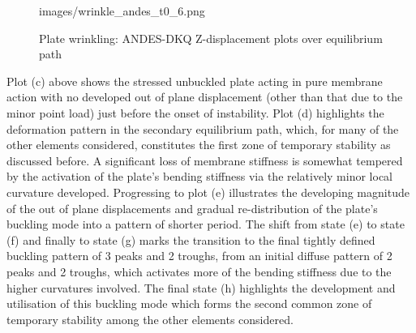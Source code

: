 \begin{figure}[H]
{	{images/wrinkle_andes_t0_6.png}}
	\\
	\caption{\label{wrinkle 3}Plate wrinkling: ANDES-DKQ Z-displacement plots over equilibrium path}
\end{figure}

Plot (c) above shows the stressed unbuckled plate acting in pure membrane action with no developed out of plane displacement (other than that due to the minor point load) just before the onset of instability. Plot (d) highlights the deformation pattern in the secondary equilibrium path, which, for many of the other elements considered, constitutes the first zone of temporary stability as discussed before. A significant loss of membrane stiffness is somewhat tempered by the activation of the plate's bending stiffness via the relatively minor local curvature developed. Progressing to plot (e) illustrates the developing magnitude of the out of plane displacements and gradual re-distribution of the plate's buckling mode into a pattern of shorter period. The shift from state (e) to state (f) and finally to state (g) marks the transition to the final tightly defined buckling pattern of 3 peaks and 2 troughs, from an initial diffuse pattern of 2 peaks and 2 troughs, which activates more of the bending stiffness due to the higher curvatures involved. The final state (h) highlights the development and utilisation of this buckling mode which forms the second common zone of temporary stability among the other elements considered.

